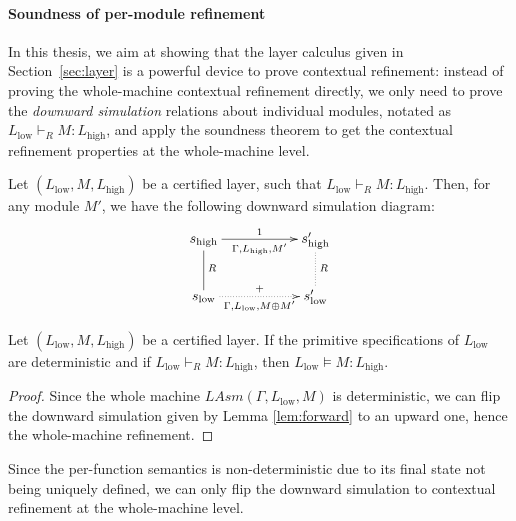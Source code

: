\paragraph{Soundness of per-module refinement}

In this thesis, we aim at showing that the layer calculus given in
Section~{\ref{sec:layer}} is a powerful device to prove contextual
refinement: instead of proving the whole-machine contextual refinement directly, 
we only need to prove the \emph{downward simulation} relations about
individual modules, notated as $L_{\text{low}} \vdash_R M : L_{\text{high}}$, 
and apply the soundness theorem to get the contextual refinement properties
at the whole-machine level.

\begin{lemma} \label{lem:forward}
Let $(L_{\text{low}}, M, L_{\text{high}})$ be a certified layer,
such that $L_{\text{low}} \vdash_R M : L_{\text{high}}$. Then,
for any module $M'$, we have the following downward simulation diagram:
\[
\xymatrix{
s_{\text{high}} \ar[rr]_{\Gamma, L_{\text{high}}, M'}^1 \ar@{-}[d]^R & & s'_{\text{high}} \ar@{.}[d]^R \\
s_{\text{low}} \ar@{.>}[rr]_{\Gamma, L_{\text{low}}, M \oplus M'}^{+} & & s'_{\text{low}}
}
\]
\end{lemma}

\begin{theorem}[Soundness]\label{thm:sound}
Let $(L_{\text{low}}, M, L_{\text{high}})$ be a certified layer. If the
primitive specifications of $L_{\text{low}}$ are deterministic and if
$L_{\text{low}} \vdash_R M : L_{\text{high}}$, then $L_{\text{low}}
\vDash M : L_{\text{high}}$.
\end{theorem}
\begin{proof}
Since the whole machine {\small $LAsm(\Gamma, L_{\text{low}}, M)$} is
deterministic, we can flip the downward simulation given by Lemma
\ref{lem:forward} to an upward one, hence the whole-machine refinement.
\end{proof}

Since the per-function semantics is non-deterministic due to its final
state not being uniquely defined, we can only flip the downward
simulation to contextual refinement at the whole-machine level.


